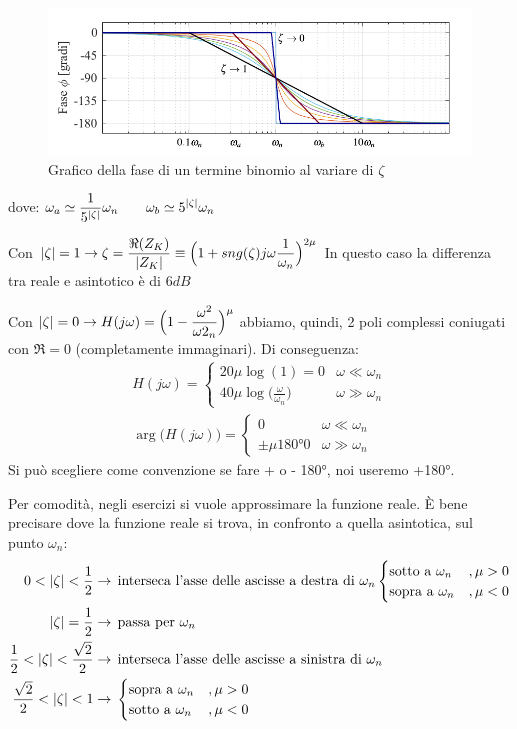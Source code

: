 \begin{figure}[H]
	\centering
	\includegraphics[width=0.7\linewidth]{immagini/cap6_Bode/bodeBin-Fas}
	\caption{Grafico della fase di un termine binomio al variare di $ \zeta $}
	\label{fig:bodeBin-Fas}
\end{figure}
dove: $\displaystyle \omega_a \simeq \frac{1}{5^{\lvert\zeta\rvert}}\omega_n \qquad \omega_b \simeq 5^{\lvert\zeta\rvert}\omega_n$


	Con $\displaystyle \lvert\zeta\rvert=1 \rightarrow \zeta =\frac{\Re (Z_K)}{\lvert Z_K\rvert} \equiv \Big(1+sng(\zeta)j \omega \frac{1}{\omega_n}\Big)^{2\mu} $  In questo caso la differenza tra reale e asintotico è di $ 6 dB $
	
	Con $ \displaystyle \lvert\zeta\rvert = 0 \rightarrow H(j\omega) = \Big(1-\frac{\omega^2}{\omega2_n}\Big)^\mu $ abbiamo, quindi, 2 poli complessi coniugati con $ \Re =0 $ (completamente immaginari). Di conseguenza:
	\begin{gather*}
		H(j\omega)=
		\begin{cases}
			20\mu \log(1)=0 &\omega \ll \omega_n\\
			40\mu\log\big(\frac{\omega}{\omega_n}\big) &\omega \gg \omega_n
		\end{cases}\\
		\arg \big(H(j\omega)\big) = 
		\begin{cases}
			0 &\omega \ll \omega_n\\
			\pm \mu \ang{180} 0 &\omega \gg \omega_n
		\end{cases}
	\end{gather*}
Si può scegliere come convenzione se fare + o - \ang{180}, noi useremo +\ang{180}.

Per comodità, negli esercizi si vuole approssimare la funzione reale. È bene precisare dove la funzione reale si trova, in confronto a quella asintotica, sul punto $ \omega_n $:
\begin{align*}
	0<\lvert\zeta\rvert<\frac{1}{2} &\rightarrow \, \text{interseca l'asse delle ascisse a destra di $ \omega_n $}
		\begin{cases}
			\text{sotto a }\omega_n &,\mu >0\\
			\text{sopra a }\omega_n &,\mu <0
		\end{cases}\\
	\lvert\zeta\rvert =\frac{1}{2} &\rightarrow\, \text{passa per $ \omega_n $}\\
	\frac{1}{2}<\lvert\zeta\rvert<\frac{\sqrt{2}}{2} &\rightarrow \, \text{interseca l'asse delle ascisse a sinistra di $ \omega_n $}\\
	\frac{\sqrt{2}}{2}<\lvert\zeta\rvert<1 &\rightarrow \,
		\begin{cases}
			\text{sopra a }\omega_n &,\mu >0\\
			\text{sotto a }\omega_n &,\mu <0
		\end{cases}
\end{align*}



